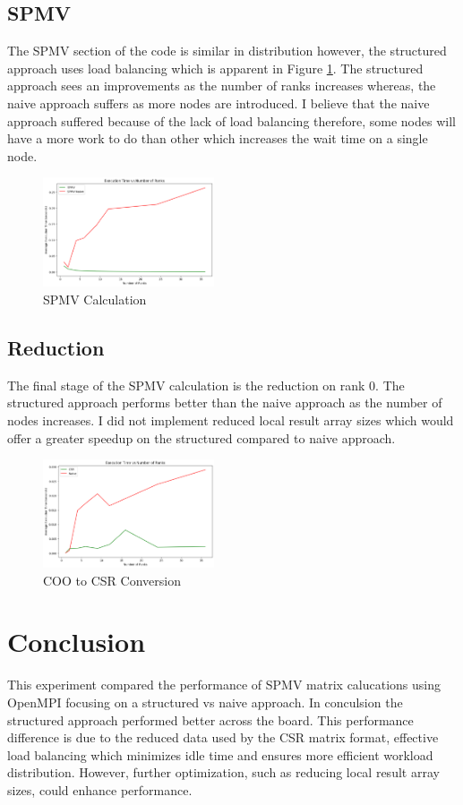 \documentclass[conference]{IEEEtran}
\begin{document}
\subsection{SPMV}
The SPMV section of the code is similar in distribution however, the structured approach uses load balancing which is apparent in Figure \ref{fig:spmv}. The structured approach sees an improvements as the number of ranks increases whereas, the naive approach suffers as more nodes are introduced. I believe that the naive approach suffered because of the lack of load balancing therefore, some nodes will have a more work to do than other which increases the wait time on a single node.
\begin{figure}[H]
    \centering
    \includegraphics[width=0.45\textwidth]{../img/spmv.png}
    \caption{SPMV Calculation}
    \label{fig:spmv}
\end{figure}

\subsection{Reduction}
The final stage of the SPMV calculation is the reduction on rank 0. The structured approach performs better than the naive approach as the number of nodes increases. I did not implement reduced local result array sizes which would offer a greater speedup on the structured compared to naive approach.
\begin{figure}[H]
    \centering
    \includegraphics[width=0.45\textwidth]{../img/reduce.png}
    \caption{COO to CSR Conversion}
    \label{fig:conversion}
\end{figure}

\section{Conclusion}
This experiment compared the performance of SPMV matrix calucations using OpenMPI focusing on a structured vs naive approach. 
In conculsion the structured approach performed better across the board.
This performance difference is due to the reduced data used by the CSR matrix format, effective load balancing which minimizes idle time and ensures more efficient workload distribution.
However, further optimization, such as reducing local result array sizes, could enhance performance.
\end{document}
